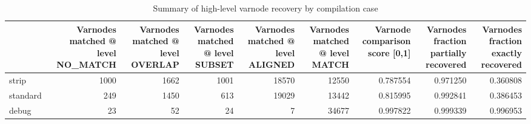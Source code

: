 \begin{table}
\centering
\caption{Summary of high-level varnode recovery by compilation case}
\label{table:opts-varnodes-summary}
\begin{tabular}{lrrrrrrrr}
\toprule
{} &  Varnodes matched @ level NO\_MATCH &  Varnodes matched @ level OVERLAP &  Varnodes matched @ level SUBSET &  Varnodes matched @ level ALIGNED &  Varnodes matched @ level MATCH &  Varnode comparison score [0,1] &  Varnodes fraction partially recovered &  Varnodes fraction exactly recovered \\
\midrule
strip    &                               1000 &                              1662 &                             1001 &                             18570 &                           12550 &                        0.787554 &                               0.971250 &                             0.360808 \\
standard &                                249 &                              1450 &                              613 &                             19029 &                           13442 &                        0.815995 &                               0.992841 &                             0.386453 \\
debug    &                                 23 &                                52 &                               24 &                                 7 &                           34677 &                        0.997822 &                               0.999339 &                             0.996953 \\
\bottomrule
\end{tabular}
\end{table}
